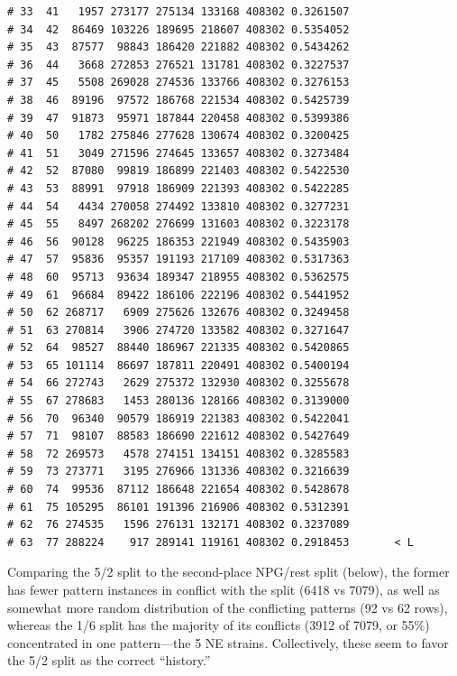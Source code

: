 \documentclass{article}\usepackage[]{graphicx}\usepackage[]{color}
\makeatletter
\newenvironment{kframe}{%
 \def\at@end@of@kframe{}%
 \ifinner\ifhmode%
  \def\at@end@of@kframe{\end{minipage}}%
  \begin{minipage}{\columnwidth}%
 \fi\fi%
 \def\FrameCommand##1{\hskip\@totalleftmargin \hskip-\fboxsep
 \colorbox{shadecolor}{##1}\hskip-\fboxsep
     \hskip-\linewidth \hskip-\@totalleftmargin \hskip\columnwidth}%
 \MakeFramed {\advance\hsize-\width
   \@totalleftmargin\z@ \linewidth\hsize
   \@setminipage}}%
 {\par\unskip\endMakeFramed%
 \at@end@of@kframe}
\newenvironment{knitrout}{}{} %
\makeatother
\begin{document}
\begin{knitrout}
\begin{kframe}
\begin{verbatim}
# 33  41   1957 273177 275134 133168 408302 0.3261507          
# 34  42  86469 103226 189695 218607 408302 0.5354052          
# 35  43  87577  98843 186420 221882 408302 0.5434262          
# 36  44   3668 272853 276521 131781 408302 0.3227537          
# 37  45   5508 269028 274536 133766 408302 0.3276153          
# 38  46  89196  97572 186768 221534 408302 0.5425739          
# 39  47  91873  95971 187844 220458 408302 0.5399386          
# 40  50   1782 275846 277628 130674 408302 0.3200425          
# 41  51   3049 271596 274645 133657 408302 0.3273484          
# 42  52  87080  99819 186899 221403 408302 0.5422530          
# 43  53  88991  97918 186909 221393 408302 0.5422285          
# 44  54   4434 270058 274492 133810 408302 0.3277231          
# 45  55   8497 268202 276699 131603 408302 0.3223178          
# 46  56  90128  96225 186353 221949 408302 0.5435903          
# 47  57  95836  95357 191193 217109 408302 0.5317363          
# 48  60  95713  93634 189347 218955 408302 0.5362575          
# 49  61  96684  89422 186106 222196 408302 0.5441952          
# 50  62 268717   6909 275626 132676 408302 0.3249458          
# 51  63 270814   3906 274720 133582 408302 0.3271647          
# 52  64  98527  88440 186967 221335 408302 0.5420865          
# 53  65 101114  86697 187811 220491 408302 0.5400194          
# 54  66 272743   2629 275372 132930 408302 0.3255678          
# 55  67 278683   1453 280136 128166 408302 0.3139000          
# 56  70  96340  90579 186919 221383 408302 0.5422041          
# 57  71  98107  88583 186690 221612 408302 0.5427649          
# 58  72 269573   4578 274151 134151 408302 0.3285583          
# 59  73 273771   3195 276966 131336 408302 0.3216639          
# 60  74  99536  87112 186648 221654 408302 0.5428678          
# 61  75 105295  86101 191396 216906 408302 0.5312391          
# 62  76 274535   1596 276131 132171 408302 0.3237089          
# 63  77 288224    917 289141 119161 408302 0.2918453       < L
\end{verbatim}
\end{kframe}
\end{knitrout}

Comparing the 5/2 split to the second-place NPG/rest split (below), the former has fewer pattern instances in conflict
with the split (6418 vs 7079), as well as somewhat more random distribution of the conflicting patterns (92 vs 62 rows),
whereas the 1/6 split has the majority of its conflicts (3912 of 7079, or 55\%) concentrated in one pattern---the 5 NE
strains.  Collectively, these seem to favor the 5/2 split as the correct ``history.''
\end{document}
